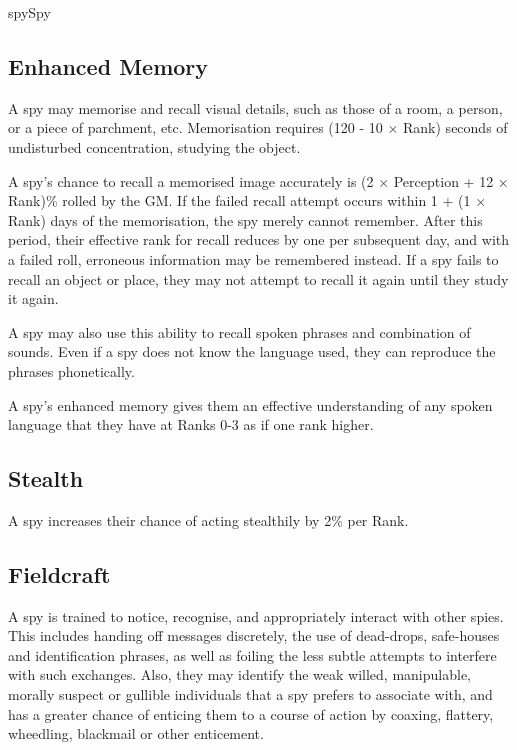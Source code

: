 \begin{Skill}[2.0]{spy}{Spy}
\subsection{Enhanced Memory}

\begin{Itemize}

\item A spy may memorise and recall visual details, such as those of a
  room, a person, or a piece of parchment, etc. Memorisation requires
  (120 - 10 × Rank) seconds of undisturbed concentration, studying
  the object.

\item A spy’s chance to recall a memorised image accurately is (2 ×
  Perception + 12 × Rank)\% rolled by the GM.  If the failed recall
  attempt occurs within 1 + (1 × Rank) days of the memorisation, the
  spy merely cannot remember.  After this period, their effective rank
  for recall reduces by one per subsequent day, and with a failed
  roll, erroneous information may be remembered instead.  If a spy
  fails to recall an object or place, they may not attempt to recall
  it again until they study it again.

\item A spy may also use this ability to recall spoken phrases and
  combination of sounds.  Even if a spy does not know the language
  used, they can reproduce the phrases phonetically.

\item A spy’s enhanced memory gives them an effective understanding of
  any spoken language that they have at Ranks 0-3 as if one rank
  higher.

\end{Itemize}

\subsection{Stealth}

A spy increases their chance of acting stealthily by 2\% per Rank. 

\subsection{Fieldcraft}

A spy is trained to notice, recognise, and appropriately interact with
other spies. This includes handing off messages discretely, the use
of dead-drops, safe-houses and identification phrases, as well as
foiling the less subtle attempts to interfere with such exchanges.
Also, they may identify the weak willed, manipulable, morally suspect
or gullible individuals that a spy prefers to associate with, and has
a greater chance of enticing them to a course of action by coaxing,
flattery, wheedling, blackmail or other enticement.


\end{Skill}

